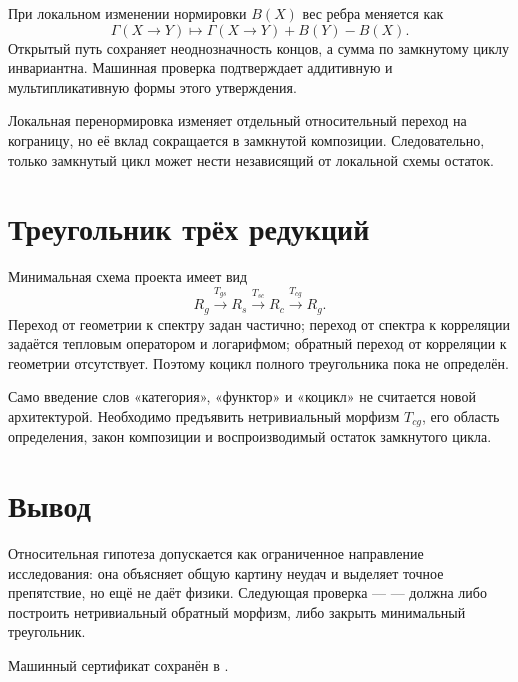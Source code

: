 При локальном изменении нормировки \(B(X)\) вес ребра меняется как
\begin{equation}
 \Gamma(X\to Y)\mapsto\Gamma(X\to Y)+B(Y)-B(X).
\end{equation}
Открытый путь сохраняет неоднозначность концов, а сумма по замкнутому циклу
инвариантна. Машинная проверка подтверждает аддитивную и мультипликативную
формы этого утверждения.

\begin{theorem}
Локальная перенормировка изменяет отдельный относительный переход на
кограницу, но её вклад сокращается в замкнутой композиции. Следовательно,
только замкнутый цикл может нести независящий от локальной схемы остаток.
\end{theorem}

\section{Треугольник трёх редукций}

Минимальная схема проекта имеет вид
\begin{equation}
 R_g\xrightarrow{T_{gs}}R_s\xrightarrow{T_{sc}}R_c
 \xrightarrow{T_{cg}}R_g.
\end{equation}
Переход от геометрии к спектру задан частично; переход от спектра к
корреляции задаётся тепловым оператором и логарифмом; обратный переход от
корреляции к геометрии отсутствует. Поэтому коцикл полного треугольника пока
не определён.

\begin{nogocriterion}
Само введение слов «категория», «функтор» и «коцикл» не считается новой
архитектурой. Необходимо предъявить нетривиальный морфизм \(T_{cg}\), его
область определения, закон композиции и воспроизводимый остаток замкнутого
цикла.
\end{nogocriterion}

\section{Вывод}

Относительная гипотеза допускается как ограниченное направление
исследования: она объясняет общую картину неудач и выделяет точное
препятствие, но ещё не даёт физики. Следующая проверка ---
 --- должна либо построить
нетривиальный обратный морфизм, либо закрыть минимальный треугольник.

Машинный сертификат сохранён в
.